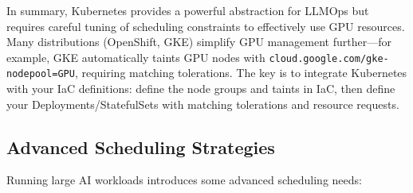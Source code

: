 In summary, Kubernetes provides a powerful abstraction for LLMOps but requires careful tuning of scheduling constraints to effectively use GPU resources. Many distributions (OpenShift, GKE) simplify GPU management further---for example, GKE automatically taints GPU nodes with \texttt{cloud.google.com/gke-nodepool=GPU}, requiring matching tolerations. The key is to integrate Kubernetes with your IaC definitions: define the node groups and taints in IaC, then define your Deployments/StatefulSets with matching tolerations and resource requests.

\subsection{Advanced Scheduling Strategies}
\label{sec:orchestration-advanced}

Running large AI workloads introduces some advanced scheduling needs:

